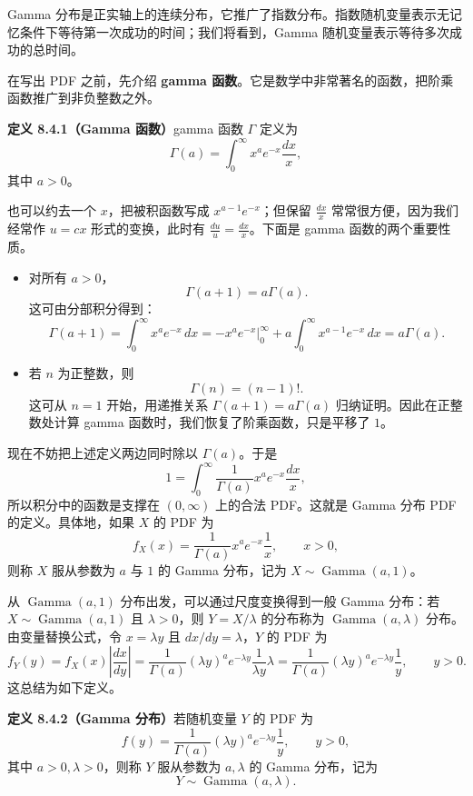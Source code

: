 \documentclass[UTF8,12pt,a4paper,fontset=fandol]{ctexart}
\begin{document}
Gamma 分布是正实轴上的连续分布，它推广了指数分布。指数随机变量表示无记忆条件下等待第一次成功的时间；我们将看到，Gamma 随机变量表示等待多次成功的总时间。

在写出 PDF 之前，先介绍 \textbf{gamma 函数}。它是数学中非常著名的函数，把阶乘函数推广到非负整数之外。

\noindent\textbf{定义 8.4.1（Gamma 函数）}\quad gamma 函数 $\Gamma$ 定义为
\[
  \Gamma(a)=\int_0^\infty x^a e^{-x}\frac{dx}{x},
\]
其中 $a>0$。

也可以约去一个 $x$，把被积函数写成 $x^{a-1}e^{-x}$；但保留 $\frac{dx}{x}$ 常常很方便，因为我们经常作 $u=cx$ 形式的变换，此时有 $\frac{du}{u}=\frac{dx}{x}$。下面是 gamma 函数的两个重要性质。

\begin{itemize}
  \item 对所有 $a>0$，
  \[
    \Gamma(a+1)=a\Gamma(a).
  \]
  这可由分部积分得到：
  \[
    \Gamma(a+1)=\int_0^\infty x^a e^{-x}\,dx
    =-x^a e^{-x}\bigg|_0^\infty
    +a\int_0^\infty x^{a-1}e^{-x}\,dx
    =a\Gamma(a).
  \]

  \item 若 $n$ 为正整数，则
  \[
    \Gamma(n)=(n-1)!.
  \]
  这可从 $n=1$ 开始，用递推关系 $\Gamma(a+1)=a\Gamma(a)$ 归纳证明。因此在正整数处计算 gamma 函数时，我们恢复了阶乘函数，只是平移了 $1$。
\end{itemize}

现在不妨把上述定义两边同时除以 $\Gamma(a)$。于是
\[
  1=\int_0^\infty \frac{1}{\Gamma(a)}x^ae^{-x}\frac{dx}{x},
\]
所以积分中的函数是支撑在 $(0,\infty)$ 上的合法 PDF。这就是 Gamma 分布 PDF 的定义。具体地，如果 $X$ 的 PDF 为
\[
  f_X(x)=\frac{1}{\Gamma(a)}x^ae^{-x}\frac1x,\qquad x>0,
\]
则称 $X$ 服从参数为 $a$ 与 $1$ 的 Gamma 分布，记为 $X\sim\operatorname{Gamma}(a,1)$。

从 $\operatorname{Gamma}(a,1)$ 分布出发，可以通过尺度变换得到一般 Gamma 分布：若 $X\sim\operatorname{Gamma}(a,1)$ 且 $\lambda>0$，则 $Y=X/\lambda$ 的分布称为 $\operatorname{Gamma}(a,\lambda)$ 分布。由变量替换公式，令 $x=\lambda y$ 且 $dx/dy=\lambda$，$Y$ 的 PDF 为
\[
  f_Y(y)=f_X(x)\left|\frac{dx}{dy}\right|
  =\frac{1}{\Gamma(a)}(\lambda y)^a e^{-\lambda y}\frac{1}{\lambda y}\lambda
  =\frac{1}{\Gamma(a)}(\lambda y)^a e^{-\lambda y}\frac1y,\qquad y>0.
\]
这总结为如下定义。

\noindent\textbf{定义 8.4.2（Gamma 分布）}\quad 若随机变量 $Y$ 的 PDF 为
\[
  f(y)=\frac{1}{\Gamma(a)}(\lambda y)^a e^{-\lambda y}\frac1y,\qquad y>0,
\]
其中 $a>0,\lambda>0$，则称 $Y$ 服从参数为 $a,\lambda$ 的 Gamma 分布，记为
\[
  Y\sim\operatorname{Gamma}(a,\lambda).
\]
\end{document}
